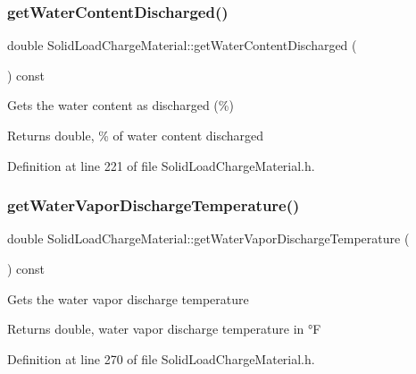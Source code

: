 \subsubsection{\texorpdfstring{get\+Water\+Content\+Discharged()}{getWaterContentDischarged()}\hspace{0.1cm}{\footnotesize\ttfamily [3/3]}}
{\footnotesize\ttfamily double Solid\+Load\+Charge\+Material\+::get\+Water\+Content\+Discharged (\begin{DoxyParamCaption}{ }\end{DoxyParamCaption}) const\hspace{0.3cm}{\ttfamily [inline]}}

Gets the water content as discharged (\%) \begin{DoxyReturn}{Returns}
double, \% of water content discharged 
\end{DoxyReturn}


Definition at line 221 of file Solid\+Load\+Charge\+Material.\+h.

\mbox{\label{class_solid_load_charge_material_a267f26d42f8ba2655c09f561fc0f6cb1}} 
\subsubsection{\texorpdfstring{get\+Water\+Vapor\+Discharge\+Temperature()}{getWaterVaporDischargeTemperature()}\hspace{0.1cm}{\footnotesize\ttfamily [1/3]}}
{\footnotesize\ttfamily double Solid\+Load\+Charge\+Material\+::get\+Water\+Vapor\+Discharge\+Temperature (\begin{DoxyParamCaption}{ }\end{DoxyParamCaption}) const\hspace{0.3cm}{\ttfamily [inline]}}

Gets the water vapor discharge temperature \begin{DoxyReturn}{Returns}
double, water vapor discharge temperature in °F 
\end{DoxyReturn}


Definition at line 270 of file Solid\+Load\+Charge\+Material.\+h.

